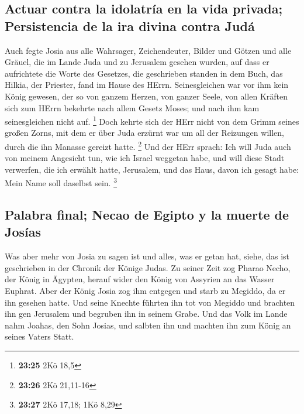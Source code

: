 \hypertarget{actuar-contra-la-idolatruxeda-en-la-vida-privada-persistencia-de-la-ira-divina-contra-juduxe1}{%
\subsection{Actuar contra la idolatría en la vida privada; Persistencia
de la ira divina contra
Judá}\label{actuar-contra-la-idolatruxeda-en-la-vida-privada-persistencia-de-la-ira-divina-contra-juduxe1}}

 Auch fegte Josia aus alle Wahrsager, Zeichendeuter,
Bilder und Götzen und alle Gräuel, die im Lande Juda und zu Jerusalem
gesehen wurden, auf dass er aufrichtete die Worte des Gesetzes, die
geschrieben standen in dem Buch, das Hilkia, der Priester, fand im Hause
des HErrn.  Seinesgleichen war vor ihm kein König
gewesen, der so von ganzem Herzen, von ganzer Seele, von allen Kräften
sich zum HErrn bekehrte nach allem Gesetz Moses; und nach ihm kam
seinesgleichen nicht auf. \footnote{\textbf{23:25} 2Kö 18,5}
 Doch kehrte sich der HErr nicht von dem Grimm seines
großen Zorns, mit dem er über Juda erzürnt war um all der Reizungen
willen, durch die ihn Manasse gereizt hatte. \footnote{\textbf{23:26}
  2Kö 21,11-16}  Und der HErr sprach: Ich will Juda auch
von meinem Angesicht tun, wie ich Israel weggetan habe, und will diese
Stadt verwerfen, die ich erwählt hatte, Jerusalem, und das Haus, davon
ich gesagt habe: Mein Name soll daselbst sein. \footnote{\textbf{23:27}
  2Kö 17,18; 1Kö 8,29}

\hypertarget{palabra-final-necao-de-egipto-y-la-muerte-de-josuxedas}{%
\subsection{Palabra final; Necao de Egipto y la muerte de
Josías}\label{palabra-final-necao-de-egipto-y-la-muerte-de-josuxedas}}

 Was aber mehr von Josia zu sagen ist und alles, was er
getan hat, siehe, das ist geschrieben in der Chronik der Könige Judas.
 Zu seiner Zeit zog Pharao Necho, der König in Ägypten,
herauf wider den König von Assyrien an das Wasser Euphrat. Aber der
König Josia zog ihm entgegen und starb zu Megiddo, da er ihn gesehen
hatte.  Und seine Knechte führten ihn tot von Megiddo und
brachten ihn gen Jerusalem und begruben ihn in seinem Grabe. Und das
Volk im Lande nahm Joahas, den Sohn Josias, und salbten ihn und machten
ihn zum König an seines Vaters Statt.


